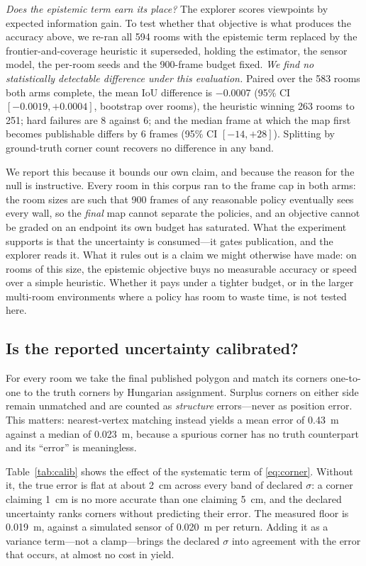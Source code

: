 \documentclass[conference,letterpaper,10pt]{IEEEtran}
\begin{document}
\emph{Does the epistemic term earn its place?} The explorer scores viewpoints by expected
information gain. To test whether that objective is what produces the accuracy above, we re-ran all
594 rooms with the epistemic term replaced by the frontier-and-coverage heuristic it superseded,
holding the estimator, the sensor model, the per-room seeds and the \num{900}-frame budget fixed.
\emph{We find no statistically detectable difference under this evaluation.} Paired over the 583
rooms both arms complete, the mean IoU
difference is \num{-0.0007} (95\% CI $[-0.0019, +0.0004]$, bootstrap over rooms), the heuristic
winning 263 rooms to 251; hard failures are 8 against 6; and the median frame at which the map first
becomes publishable differs by \num{6} frames (95\% CI $[-14, +28]$). Splitting by ground-truth
corner count recovers no difference in any band.

We report this because it bounds our own claim, and because the reason for the null is instructive.
Every room in this corpus ran to the frame cap in both arms: the room sizes are such that
\num{900} frames of any reasonable policy eventually sees every wall, so the \emph{final} map cannot
separate the policies, and an objective cannot be graded on an endpoint its own budget has saturated.
What the experiment supports is that the uncertainty is consumed---it gates publication, and the
explorer reads it. What it rules out is a claim we might otherwise have made: on rooms of this size,
the epistemic objective buys no measurable accuracy or speed over a simple heuristic. Whether it pays
under a tighter budget, or in the larger multi-room environments where a policy has room to waste
time, is not tested here.

\subsection{Is the reported uncertainty calibrated?}
\label{sec:calib}

For every room we take the final published polygon and match its corners one-to-one to the truth
corners by Hungarian assignment. Surplus corners on either side remain unmatched and are counted as
\emph{structure} errors---never as position error. This matters: nearest-vertex matching instead
yields a mean error of \SI{0.43}{\meter} against a median of \SI{0.023}{\meter}, because a spurious
corner has no truth counterpart and its ``error'' is meaningless.

Table~\ref{tab:calib} shows the effect of the systematic term of \eqref{eq:corner}. Without it, the
true error is flat at about \SI{2}{\centi\meter} across every band of declared $\sigma$: a corner
claiming \SI{1}{\centi\meter} is no more accurate than one claiming \SI{5}{\centi\meter}, and the
declared uncertainty ranks corners without predicting their error. The measured floor is
\SI{0.019}{\meter}, against a simulated sensor of \SI{0.020}{\meter} per return. Adding it as a
variance term---not a clamp---brings the declared $\sigma$ into agreement with the error that
occurs, at almost no cost in yield.
\end{document}
